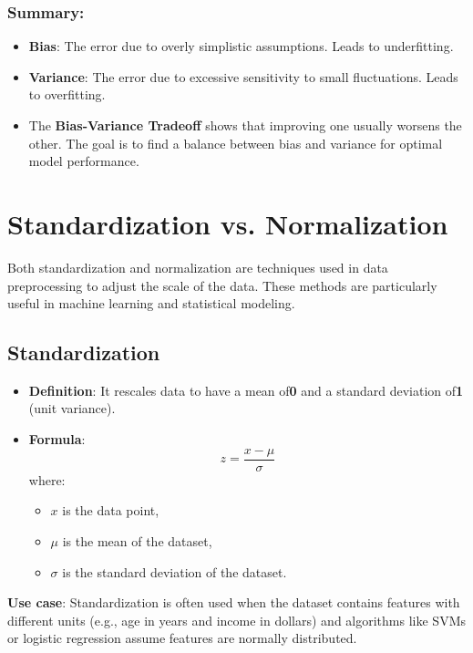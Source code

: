 \documentclass[12pt]{book}
\begin{document}
\subsubsection*{Summary:}

\begin{itemize}
    \item [-] \textbf{Bias}: The error due to overly simplistic assumptions. Leads to underfitting.
    \item [-] \textbf{Variance}: The error due to excessive sensitivity to small fluctuations. Leads to overfitting.
    \item [-] The \textbf{Bias-Variance Tradeoff} shows that improving one usually worsens the other. The goal is to find a balance between bias and variance for optimal model performance.
\end{itemize}

\clearpage

\section{\textbf{Standardization vs. Normalization}}

Both standardization and normalization are techniques used in data preprocessing to adjust the scale of the data. These methods are particularly useful in machine learning and statistical modeling.


\subsection*{\textbf{Standardization}}

\begin{itemize}
    \item [-] \textbf{Definition}: It rescales data to have a mean of\textbf{0} and a standard deviation of\textbf{1} (unit variance). 
    \item [-] \textbf{Formula}:
    \[
        z = \frac{x - \mu}{\sigma}
    \]
    where:
    \begin{itemize}
        \item [-] \( x \) is the data point,
        \item [-] \( \mu \) is the mean of the dataset,
        \item [-] \( \sigma \) is the standard deviation of the dataset.
    \end{itemize}
\end{itemize}

\textbf{Use case}: Standardization is often used when the dataset contains features with different units (e.g., age in years and income in dollars) and algorithms like SVMs or logistic regression assume features are normally distributed.
\end{document}

